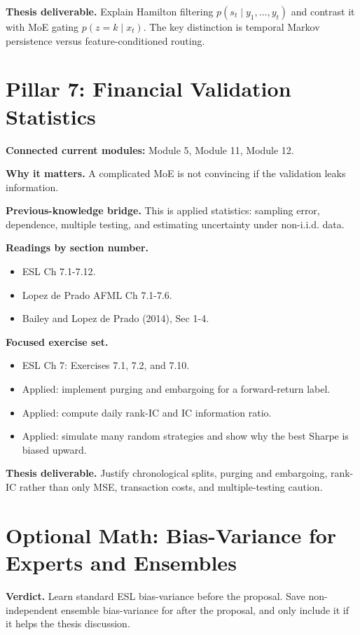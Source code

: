 \documentclass[11pt]{article}
\begin{document}
\textbf{Thesis deliverable.} Explain Hamilton filtering \(p(s_t \mid y_1,\ldots,y_t)\) and contrast it with MoE gating \(p(z=k \mid x_t)\). The key distinction is temporal Markov persistence versus feature-conditioned routing.

\section{Pillar 7: Financial Validation Statistics}

\textbf{Connected current modules:} Module 5, Module 11, Module 12.

\textbf{Why it matters.} A complicated MoE is not convincing if the validation leaks information.

\textbf{Previous-knowledge bridge.} This is applied statistics: sampling error, dependence, multiple testing, and estimating uncertainty under non-i.i.d. data.

\textbf{Readings by section number.}
\begin{itemize}
  \item ESL Ch 7.1-7.12.
  \item Lopez de Prado AFML Ch 7.1-7.6.
  \item Bailey and Lopez de Prado (2014), Sec 1-4.
\end{itemize}

\textbf{Focused exercise set.}
\begin{itemize}
  \item ESL Ch 7: Exercises 7.1, 7.2, and 7.10.
  \item Applied: implement purging and embargoing for a forward-return label.
  \item Applied: compute daily rank-IC and IC information ratio.
  \item Applied: simulate many random strategies and show why the best Sharpe is biased upward.
\end{itemize}

\textbf{Thesis deliverable.} Justify chronological splits, purging and embargoing, rank-IC rather than only MSE, transaction costs, and multiple-testing caution.

\section{Optional Math: Bias-Variance for Experts and Ensembles}

\textbf{Verdict.} Learn standard ESL bias-variance before the proposal. Save non-independent ensemble bias-variance for after the proposal, and only include it if it helps the thesis discussion.
\end{document}
